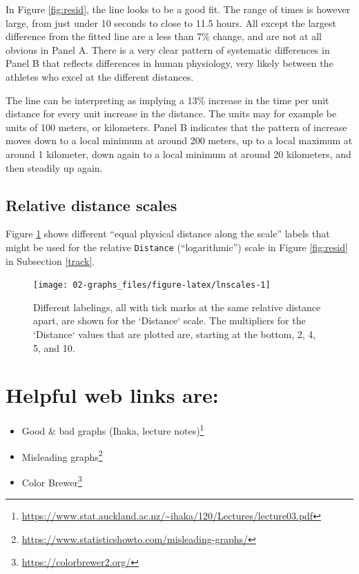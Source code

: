 \documentclass[
  10pt,
  b5paper]{book}
\providecommand{\tightlist}{%
  \setlength{\itemsep}{0pt}\setlength{\parskip}{0pt}}
\begin{document}
In Figure \ref{fig:resid}, the line looks to be a good fit.
The range of times is however large, from just under 10 seconds
to close to 11.5 hours. All except the largest difference from
the fitted line are a less than 7\% change, and are not at all
obvious in Panel A. There is a very clear pattern of systematic
differences in Panel B that reflects differences in human
physiology, very likely between the athletes who excel at the
different distances.

The line can be interpreting as implying a 13\% increase in the
time per unit distance for every unit increase in the distance.
The units may for example be units of 100 meters, or kilometers.
Panel B indicates that the pattern of increase moves down to a
local minimum at around 200 meters, up to a local maximum at
around 1 kilometer, down again to a local minimum at around 20
kilometers, and then steadily up again.

\hypertarget{relative-distance-scales}{%
\subsection*{Relative distance scales}\label{relative-distance-scales}}

Figure \ref{fig:lnscales} shows different ``equal physical
distance along the scale'' labels that might be used for the
relative \texttt{Distance} (``logarithmic'') scale in Figure
\ref{fig:resid} in Subsection \ref{track}.

\begin{figure}[H]

{\centering \texttt{[image: 02-graphs\_files/figure-latex/lnscales-1]} 

}

\caption{Different labelings, all with tick marks at the same
relative distance apart, are shown for the `Distance` scale.
The multipliers for the `Distance` values that are plotted are,
starting at the bottom, 2, 4, 5, and 10.}\label{fig:lnscales}
\end{figure}

\hypertarget{helpful-web-links-are}{%
\section{Helpful web links are:}\label{helpful-web-links-are}}

\begin{itemize}
\tightlist
\item
  Good \& bad graphs (Ihaka, lecture notes)\footnote{\url{https://www.stat.auckland.ac.nz/~ihaka/120/Lectures/lecture03.pdf}}
\item
  Misleading graphs\footnote{\url{https://www.statisticshowto.com/misleading-graphs/}}
\item
  Color Brewer\footnote{\url{https://colorbrewer2.org/}}
\end{itemize}
\end{document}
